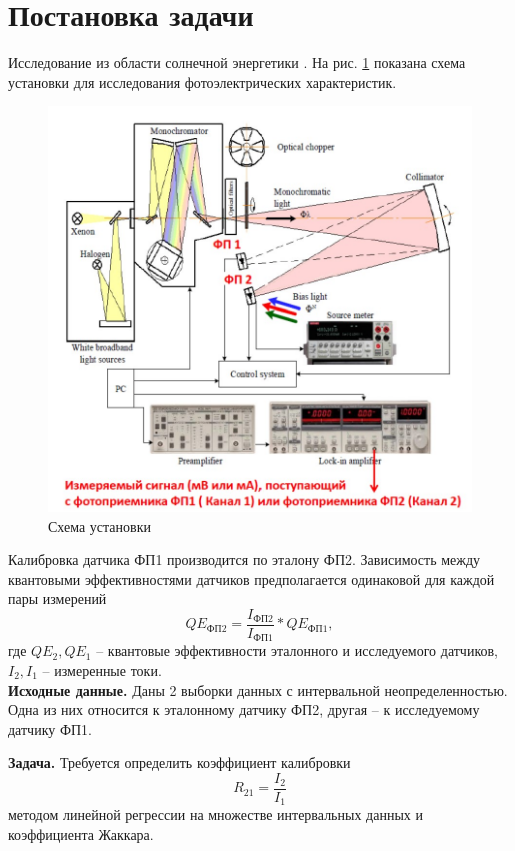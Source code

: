 \section{Постановка задачи}

Исследование из области солнечной энергетики \cite{litlink1}. На рис. \ref{pic:scheme} показана схема установки для исследования фотоэлектрических характеристик.
\begin{figure}[H]
	\centering
	\includegraphics[scale=0.9]{resources/scheme.jpg}
	\caption{Схема установки}
	\label{pic:scheme}
\end{figure}

Калибровка датчика ФП1 производится по эталону ФП2. Зависимость между квантовыми эффективностями датчиков предполагается одинаковой для каждой пары измерений
\begin{equation}
	QE_{ФП2} = \frac{I_{ФП2}}{I_{ФП1}}*QE_{ФП1},
	\label{eq:quantum}
\end{equation}
где $QE_2, QE_1$ -- квантовые эффективности эталонного и исследуемого датчиков, $I_2, I_1$ -- измеренные токи. \\

\textbf{Исходные данные.}
Даны 2 выборки данных с интервальной неопределенностью. Одна из них относится к эталонному датчику ФП2, другая -- к исследуемому датчику ФП1.

\textbf{Задача.}
Требуется определить коэффициент калибровки
\begin{equation}
	R_{21} = \frac{I_{2}}{I_{1}}
	\label{eq:task}
\end{equation}
методом линейной регрессии на множестве интервальных данных и коэффициента Жаккара.

\newpage
